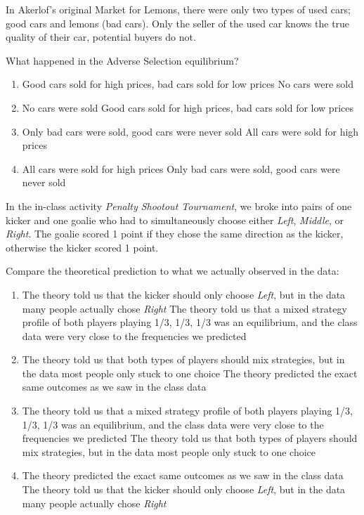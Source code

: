 \documentclass{article}
\begin{document}
\begin{question}[type=exam]{4}
  In Akerlof's original Market for Lemons, there were only two types of used cars; good cars and lemons (bad cars).
  Only the seller of the used car knows the true quality of their car, potential buyers do not.

  What happened in the Adverse Selection equilibrium?
  \begin{enumerate}[label=\alph*), noitemsep]
    \item \vary
    {Good cars sold for high prices, bad cars sold for low prices}
    {No cars were sold}
    \item \vary
    {No cars were sold}
    {Good cars sold for high prices, bad cars sold for low prices}
    \item \vary
    {Only bad cars were sold, good cars were never sold} %
    {All cars were sold for high prices}
    \item \vary
    {All cars were sold for high prices}
    {Only bad cars were sold, good cars were never sold} %
  \end{enumerate}
\end{question}

\begin{question}[type=exam]{4}
  In the in-class activity \textit{Penalty Shootout Tournament}, 
  we broke into pairs of one kicker and one goalie who had to simultaneously choose either \textit{Left}, \textit{Middle}, or \textit{Right}.
  The goalie scored 1 point if they chose the same direction as the kicker, otherwise the kicker scored 1 point.

  Compare the theoretical prediction to what we actually observed in the data:
  \begin{enumerate}[label=\alph*), noitemsep]
    \item \vary
    {The theory told us that the kicker should only choose \textit{Left}, but in the data many people actually chose \textit{Right}}
    {The theory told us that a mixed strategy profile of both players playing 1/3, 1/3, 1/3 was an equilibrium, and the class data were very close to the frequencies we predicted} %
    \item \vary
    {The theory told us that both types of players should mix strategies, but in the data most people only stuck to one choice}
    {The theory predicted the exact same outcomes as we saw in the class data}
    \item \vary
    {The theory told us that a mixed strategy profile of both players playing 1/3, 1/3, 1/3 was an equilibrium, and the class data were very close to the frequencies we predicted} %
    {The theory told us that both types of players should mix strategies, but in the data most people only stuck to one choice}
    \item \vary
    {The theory predicted the exact same outcomes as we saw in the class data}
    {The theory told us that the kicker should only choose \textit{Left}, but in the data many people actually chose \textit{Right}}
  \end{enumerate}
\end{question}
\end{document}
